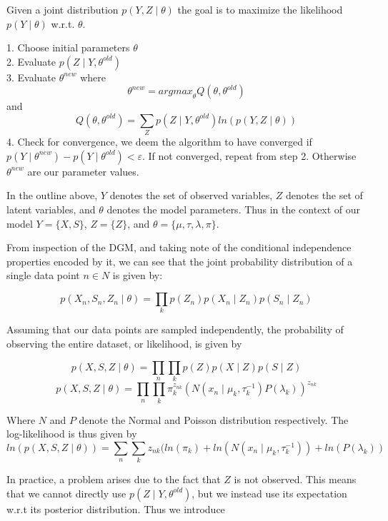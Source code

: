 \documentclass[11pt,a4paper]{article}
\begin{document}
Given a joint distribution $p(Y, Z \mid \theta)$ the goal is to maximize the likelihood $p(Y \mid \theta)$ w.r.t. $\theta$.
\begin{flushleft}

1.	Choose initial parameters $\theta$\\
2. 	Evaluate $p(Z \mid Y, \theta^{old})$\\
3.	Evaluate $\theta^{new}$ where
$$ \theta^{new} = {arg max}_{\theta} Q(\theta, \theta^{old})$$
and
$$ Q(\theta, \theta^{old}) = \sum_{Z} p(Z \mid Y, \theta^{old})ln(p(Y, Z \mid \theta))$$
4.	Check for convergence, we deem the algorithm to have converged if $p(Y \mid \theta^{new}) - p(Y \mid \theta^{old}) < \varepsilon $. If not converged, repeat from step 2. Otherwise $\theta^{new}$ are our parameter values.

\end{flushleft}

In the outline above, $Y$ denotes the set of observed variables, $Z$ denotes the set of latent variables, and $\theta$ denotes the model parameters. Thus in the context of our model $Y = \lbrace X, S\rbrace$, $Z = \lbrace Z \rbrace$, and $\theta = \lbrace \mu, \tau, \lambda, \pi\rbrace$.

From inspection of the DGM, and taking note of the conditional independence properties encoded by it, we can see that the joint probability distribution of a single data point $n \in N$ is given by:

$$ p(X_{n}, S_{n}, Z_{n} \mid \theta) = \prod_{k} p(Z_{n})p(X_{n} \mid Z_{n})p(S_{n} \mid Z_{n}) $$

Assuming that our data points are sampled independently, the probability of observing the entire dataset, or likelihood, is given by

$$ p(X, S, Z \mid \theta) = \prod_{n} \prod_{k} p(Z)p(X \mid Z)p(S \mid Z) $$
$$ p(X, S, Z \mid \theta) = \prod_{n} \prod_{k} \pi_{k}^{z_{nk}}(N(x_{n} \mid \mu_{k}, \tau_{k}^{-1})P(\lambda_{k}))^{z_{nk}} $$

Where $N$ and $P$ denote the Normal and Poisson distribution respectively. The log-likelihood is thus given by
$$ln(p(X, S, Z \mid \theta)) = \sum_{n} \sum_{k} z_{nk}(ln(\pi_{k}) + ln(N(x_{n} \mid \mu_{k}, \tau_{k}^{-1})) + ln(P(\lambda_{k})) $$

In practice, a problem arises due to the fact that $Z$ is not observed. This means that we cannot directly use $p(Z \mid Y, \theta^{old})$, but we instead use its expectation w.r.t its posterior distribution. Thus we introduce 
\end{document}
